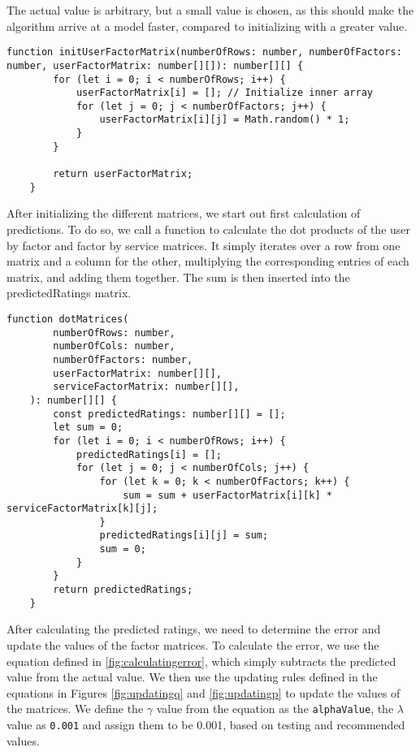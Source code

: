 The actual value is arbitrary, but a small value is chosen, as this should make the algorithm arrive at a model faster, compared to initializing with a greater value.
\begin{lstlisting}[caption={Initializing the user and factor matrix}, captionpos=b, label={lst:initUserFactor}]
    function initUserFactorMatrix(numberOfRows: number, numberOfFactors: number, userFactorMatrix: number[][]): number[][] {
        for (let i = 0; i < numberOfRows; i++) {
            userFactorMatrix[i] = []; // Initialize inner array
            for (let j = 0; j < numberOfFactors; j++) {
                userFactorMatrix[i][j] = Math.random() * 1;
            }
        }
    
        return userFactorMatrix;
    }
\end{lstlisting}
After initializing the different matrices, we start out first calculation of predictions.
To do so, we call a function to calculate the dot products of the user by factor and factor by service matrices.
It simply iterates over a row from one matrix and a column for the other, multiplying the corresponding entries of each matrix, and adding them together.
The sum is then inserted into the predictedRatings matrix.
\begin{lstlisting}[caption={}, captionpos=b, label={}]
    function dotMatrices(
        numberOfRows: number,
        numberOfCols: number,
        numberOfFactors: number,
        userFactorMatrix: number[][],
        serviceFactorMatrix: number[][],
    ): number[][] {
        const predictedRatings: number[][] = [];
        let sum = 0;
        for (let i = 0; i < numberOfRows; i++) {
            predictedRatings[i] = [];
            for (let j = 0; j < numberOfCols; j++) {
                for (let k = 0; k < numberOfFactors; k++) {
                    sum = sum + userFactorMatrix[i][k] * serviceFactorMatrix[k][j];
                }
                predictedRatings[i][j] = sum;
                sum = 0;
            }
        } 
        return predictedRatings;
    }
\end{lstlisting}
After calculating the predicted ratings, we need to determine the error and update the values of the factor matrices.
To calculate the error, we use the equation defined in \autoref{fig:calculatingerror}, which simply subtracts the predicted value from the actual value.
We then use the updating rules defined in the equations in Figures \ref{fig:updatingq} and \ref{fig:updatingp} to update the values of the matrices.
We define the $\gamma$ value from the equation as the \texttt{alphaValue}, the $\lambda$ value as \texttt{0.001} and assign them to be 0.001, based on testing and recommended values.

